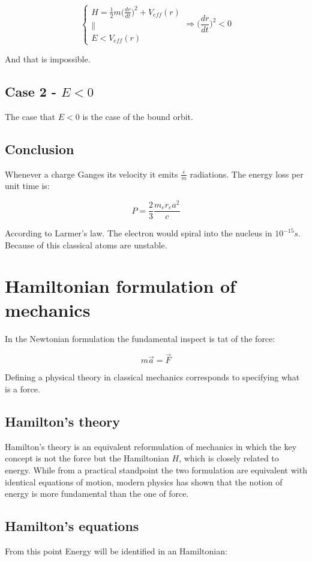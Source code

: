   $$\begin{cases} H = \frac{1}{2}m\biggl(\frac{d{r}}{d{t}}\biggr)^2+V_{eff}(r)\\
    \parallel\\
    E<V_{eff}(r)
  \end{cases}
  \Rightarrow \biggl(\frac{d{r}}{d{t}}\biggr)^2< 0$$

  And that is impossible.

  \subsection{Case 2 - $E<0$}
  The case that $E<0$ is the case of  the bound orbit.
  
  \subsection{Conclusion}
  Whenever a charge Ganges its velocity it emits $\frac{e}{m}$ radiations.
  The energy loss per unit time is:

  $$P = \frac{2}{3}\frac{m_er_ea^2}{c}$$

  According to Larmer's law.
  The electron would spiral into the nucleus in $10^{-15}s$.
  Because of this classical atoms are unstable.

\section{Hamiltonian formulation of mechanics}
In the Newtonian formulation the fundamental inspect is tat of the force:

$$m \vec{a} = \vec{F}$$

Defining a physical theory in classical mechanics corresponds to specifying what is a force.

  \subsection{Hamilton's theory}
  Hamilton's theory is an equivalent reformulation of mechanics in which the key concept is not the force but the Hamiltonian $H$, which is closely related to energy.
  While from a practical standpoint the two formulation are equivalent with identical equations of motion, modern physics has shown that the notion of energy is more fundamental than the one of force.

  \subsection{Hamilton's equations}
  From this point Energy will be identified in an Hamiltonian:

